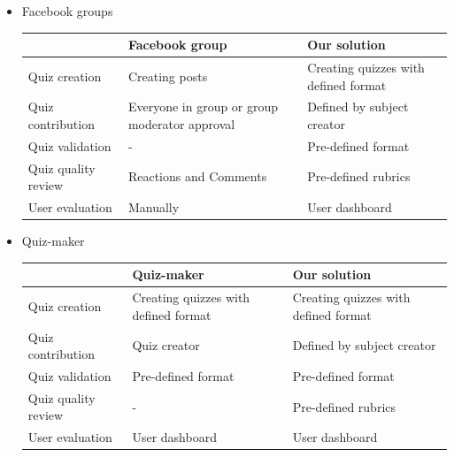 \documentclass[ 10pt]{report}
\begin{document}
    \begin{itemize}
        \item Facebook groups
        \begin{center}
            \begin{tabular}{| m{10em} | m{12em} | m{12em} |}
                \hline
                 & Facebook group & Our solution \\ 
                \hline\hline
                Quiz creation & Creating posts & \textcolor{ao(english)}{Creating quizzes with defined format} \\  
                \hline
                Quiz contribution & Everyone in group or group moderator approval & \textcolor{ao(english)}{Defined by subject creator} \\
                \hline
                Quiz validation & - & \textcolor{ao(english)}{Pre-defined format} \\
                \hline
                Quiz quality review & Reactions and Comments & \textcolor{ao(english)}{Pre-defined rubrics} \\
                \hline
                User evaluation & Manually & \textcolor{ao(english)}{User dashboard} \\
                \hline
            \end{tabular}
        \end{center}

        \item Quiz-maker
        \begin{center}
            \begin{tabular}{| m{10em} | m{12em} | m{12em} |}
                \hline
                 & Quiz-maker & Our solution \\ 
                \hline\hline
                Quiz creation & \textcolor{ao(english)}{Creating quizzes with defined format} & \textcolor{ao(english)}{Creating quizzes with defined format} \\  
                \hline
                Quiz contribution & Quiz creator & \textcolor{ao(english)}{Defined by subject creator} \\
                \hline
                Quiz validation & \textcolor{ao(english)}{Pre-defined format} & \textcolor{ao(english)}{Pre-defined format} \\
                \hline
                Quiz quality review & - & \textcolor{ao(english)}{Pre-defined rubrics} \\
                \hline
                User evaluation & \textcolor{ao(english)}{User dashboard} & \textcolor{ao(english)}{User dashboard} \\
                \hline
            \end{tabular}
        \end{center}


\end{itemize}
\end{document}
